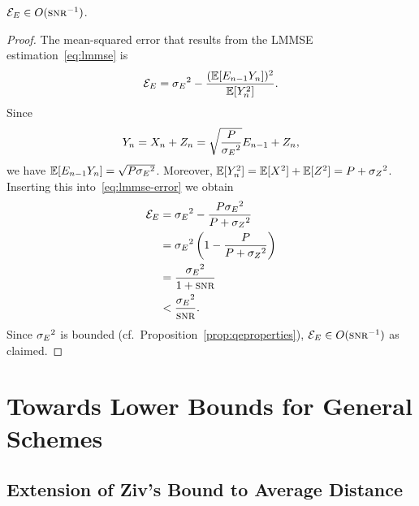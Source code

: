 \begin{lemma}
  \label{lem:eedecay}
  $\Ee \in O(\snr^{-1})$. 
\end{lemma}
\begin{proof}
  The mean-squared error that results from the LMMSE estimation~\eqref{eq:lmmse}
  is
  \begin{equation}
    \label{eq:lmmse-error}
    {{\mathcal{E}}_E} = {{\sigma_E}^2} - \frac{(\mathbb{E}[E_{n-1}
    Y_n])^2}{\mathbb{E}[Y_n^2]}. 
  \end{equation}
  Since
  \begin{equation*}
    Y_n = X_n + Z_n = \sqrt{\frac{P}{{{\sigma_E}^2}}} E_{n-1} + Z_n,
  \end{equation*}
  we have $\mathbb{E}[E_{n-1}Y_n] = \sqrt{P{{\sigma_E}^2}}$. Moreover, $\mathbb{E}[Y_n^2] = \mathbb{E}[X^2] +
  \mathbb{E}[Z^2] = P+{{\sigma_Z}^2}$.  Inserting this into~\eqref{eq:lmmse-error} we obtain
  \begin{align*}
    \Ee &= \seq - \frac{P \seq}{P + \szq} \\
    &= \seq \left( 1 - \frac{P}{P + \szq} \right) \\
    &= \frac{\seq}{1 + \snr} \\
    & < \frac{\seq}{\snr}.
  \end{align*}
  Since ${{\sigma_E}^2}$ is bounded (cf.\ Proposition~\ref{prop:qeproperties}), 
  $\Ee \in O(\snr^{-1})$ as claimed.

\end{proof}


\section{Towards Lower Bounds for General Schemes}

\subsection{Extension of Ziv's Bound to Average Distance}

